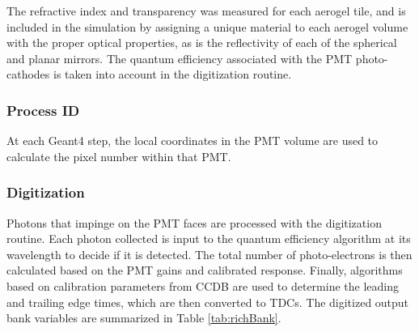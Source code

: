 The refractive index and transparency was measured for each aerogel tile, and is included in the simulation by
assigning a unique material to each aerogel volume with the proper optical properties, as is
the reflectivity of each of the spherical and planar mirrors.
The quantum efficiency associated with the PMT photo-cathodes is taken into account in the digitization routine.

\subsubsection{Process ID}
At each Geant4 step, the local coordinates in the PMT volume are used to calculate the pixel number within that PMT.

\subsubsection{Digitization}

Photons that impinge on the PMT faces are processed with the digitization routine.
Each photon collected is input to the quantum efficiency algorithm at its wavelength to decide if it is detected.
The total number of photo-electrons is then calculated based on the PMT gains and calibrated response.
Finally, algorithms based on calibration parameters from CCDB are used to determine the leading and
trailing edge times, which are then converted to TDCs.
The digitized output bank variables are summarized in Table \ref{tab:richBank}.

